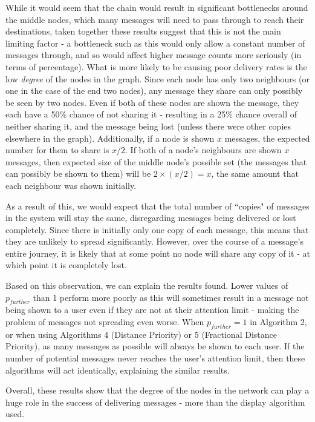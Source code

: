 \documentclass[bsc,frontabs,twoside,singlespacing,parskip,deptreport]{infthesis}     %
\begin{document}
While it would seem that the chain would result in significant bottlenecks around the middle nodes, which many messages will need to pass through to reach their destinations, taken together these results suggest that this is not the main limiting factor - a bottleneck such as this would only allow a constant number of messages through, and so would affect higher message counts more seriously (in terms of percentage). What is more likely to be causing poor delivery rates is the low \textit{degree} of the nodes in the graph. Since each node has only two neighbours (or one in the case of the end two nodes), any message they share can only possibly be seen by two nodes. Even if both of these nodes are shown the message, they each have a 50\% chance of not sharing it - resulting in a 25\% chance overall of neither sharing it, and the message being lost (unless there were other copies elsewhere in the graph). Additionally, if a node is shown $x$ messages, the expected number for them to share is $x/2$. If both of a node's neighbours are shown $x$ messages, then expected size of the middle node's possible set (the messages that can possibly be shown to them) will be $2 \times (x/2) = x$, the same amount that each neighbour was shown initially.

As a result of this, we would expect that the total number of ``copies" of messages in the system will stay the same, disregarding messages being delivered or lost completely. Since there is initially only one copy of each message, this means that they are unlikely to spread significantly. However, over the course of a message's entire journey, it is likely that at some point no node will share any copy of it - at which point it is completely lost.

Based on this observation, we can explain the results found. Lower values of $p_{further}$ than 1 perform more poorly as this will sometimes result in a message not being shown to a user even if they are not at their attention limit - making the problem of messages not spreading even worse. When $p_{further}=1$ in Algorithm 2, or when using Algorithms 4 (Distance Priority) or 5 (Fractional Distance Priority), as many messages as possible will always be shown to each user. If the number of potential messages never reaches the user's attention limit, then these algorithms will act identically, explaining the similar results.

Overall, these results show that the degree of the nodes in the network can play a huge role in the success of delivering messages - more than the display algorithm used.
\end{document}
